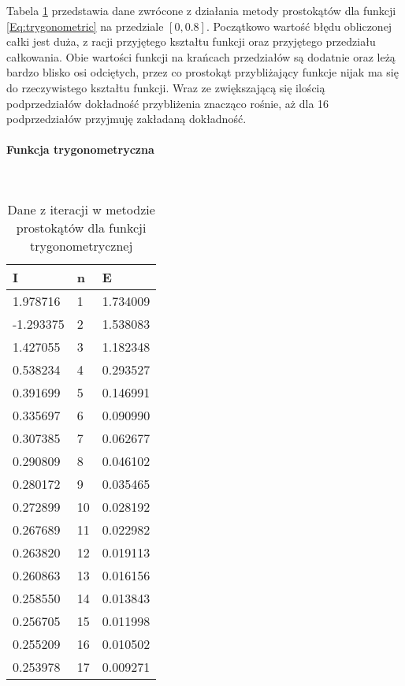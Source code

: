 \documentclass[12pt,twoside]{article}
\begin{document}
Tabela \ref{tabela1.2} przedstawia dane zwrócone z działania metody prostokątów dla funkcji \eqref{Eq:trygonometric} na przedziale $[0,0.8]$.
Początkowo wartość błędu obliczonej całki jest duża, z racji przyjętego kształtu funkcji oraz przyjętego przedziału całkowania. Obie wartości funkcji na krańcach przedziałów są dodatnie oraz leżą bardzo blisko osi odciętych, przez co prostokąt przybliżający funkcje nijak ma się do rzeczywistego kształtu funkcji. Wraz ze zwiększającą się ilością podprzedziałów dokładność przybliżenia znacząco rośnie, aż dla 16 podprzedziałów przyjmuję zakładaną dokładność.


\paragraph{Funkcja trygonometryczna}\mbox{} \\
\begin{table}[H]
\centering 
\caption{Dane z iteracji w metodzie prostokątów dla funkcji trygonometrycznej}
\label{tabela1.2}
\begin{tabular}{lll}
\toprule
I &  n &      E \\
\midrule
1.978716 &       1 &  1.734009 \\
-1.293375 &       2 & 1.538083 \\
1.427055 &       3 &  1.182348 \\
0.538234 &       4 &  0.293527 \\
0.391699 &       5 &  0.146991 \\
0.335697 &       6 &  0.090990 \\
0.307385 &       7 &  0.062677 \\
0.290809 &       8 &  0.046102 \\
0.280172 &       9 &  0.035465 \\
0.272899 &      10 &  0.028192 \\
0.267689 &      11 &  0.022982 \\
0.263820 &      12 &  0.019113 \\
0.260863 &      13 &  0.016156 \\
0.258550 &      14 &  0.013843 \\
0.256705 &      15 &  0.011998 \\
0.255209 &      16 &  0.010502 \\
0.253978 &      17 &  0.009271 \\
\bottomrule
\end{tabular}
\end{table}
\end{document}
